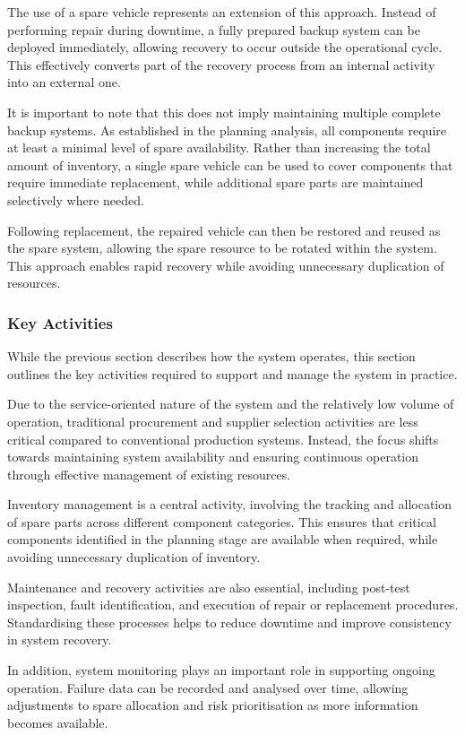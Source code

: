 \documentclass[a4paper,11pt]{article}
\begin{document}
The use of a spare vehicle represents an extension of this approach. Instead of performing repair during downtime, a fully prepared backup system can be deployed immediately, allowing recovery to occur outside the operational cycle. This effectively converts part of the recovery process from an internal activity into an external one.

It is important to note that this does not imply maintaining multiple complete backup systems. As established in the planning analysis, all components require at least a minimal level of spare availability. Rather than increasing the total amount of inventory, a single spare vehicle can be used to cover components that require immediate replacement, while additional spare parts are maintained selectively where needed.

Following replacement, the repaired vehicle can then be restored and reused as the spare system, allowing the spare resource to be rotated within the system. This approach enables rapid recovery while avoiding unnecessary duplication of resources.

\subsubsection{Key Activities}

While the previous section describes how the system operates, this section outlines the key activities required to support and manage the system in practice.

Due to the service-oriented nature of the system and the relatively low volume of operation, traditional procurement and supplier selection activities are less critical compared to conventional production systems. Instead, the focus shifts towards maintaining system availability and ensuring continuous operation through effective management of existing resources.

Inventory management is a central activity, involving the tracking and allocation of spare parts across different component categories. This ensures that critical components identified in the planning stage are available when required, while avoiding unnecessary duplication of inventory.

Maintenance and recovery activities are also essential, including post-test inspection, fault identification, and execution of repair or replacement procedures. Standardising these processes helps to reduce downtime and improve consistency in system recovery.

In addition, system monitoring plays an important role in supporting ongoing operation. Failure data can be recorded and analysed over time, allowing adjustments to spare allocation and risk prioritisation as more information becomes available.
\end{document}
